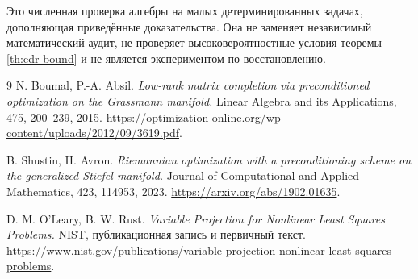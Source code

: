 \documentclass[11pt,a4paper]{article}
\theoremstyle{remark}
\begin{document}
Это численная проверка алгебры на малых детерминированных задачах,
дополняющая приведённые доказательства. Она не заменяет независимый
математический аудит, не проверяет высоковероятностные условия
теоремы \ref{th:edr-bound} и не является экспериментом по восстановлению.

\begin{thebibliography}{9}
N. Boumal, P.-A. Absil.
\emph{Low-rank matrix completion via preconditioned optimization on the
Grassmann manifold.} Linear Algebra and its Applications, 475, 200--239, 2015.
\url{https://optimization-online.org/wp-content/uploads/2012/09/3619.pdf}.

B. Shustin, H. Avron.
\emph{Riemannian optimization with a preconditioning scheme on the
generalized Stiefel manifold.}
Journal of Computational and Applied Mathematics, 423, 114953, 2023.
\url{https://arxiv.org/abs/1902.01635}.

D. M. O'Leary, B. W. Rust.
\emph{Variable Projection for Nonlinear Least Squares Problems.}
NIST, публикационная запись и первичный текст.
\url{https://www.nist.gov/publications/variable-projection-nonlinear-least-squares-problems}.
\end{thebibliography}
\end{document}
